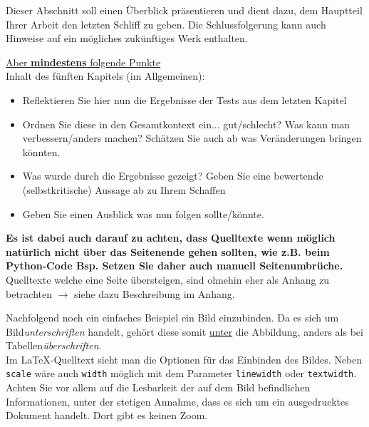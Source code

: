 Dieser Abschnitt soll einen Überblick präsentieren und dient dazu, dem Hauptteil Ihrer Arbeit den letzten Schliff zu geben. 
Die Schlussfolgerung kann auch Hinweise auf ein mögliches zukünftiges Werk enthalten.

\underline{Aber \textbf{mindestens} folgende Punkte}\\
Inhalt des fünften Kapitels (im Allgemeinen):
\begin{itemize}
    \item Reflektieren Sie hier nun die Ergebnisse der Tests aus dem letzten Kapitel
    \item Ordnen Sie diese in den Gesamtkontext ein... gut/schlecht? Was kann man verbessern/anders machen? Schätzen Sie auch ab was Veränderungen bringen könnten.
    \item Was wurde durch die Ergebnisse gezeigt? Geben Sie eine bewertende (selbstkritische) Aussage ab zu Ihrem Schaffen
    \item Geben Sie einen Ausblick was nun folgen sollte/könnte.
\end{itemize}






\textbf{Es ist dabei auch darauf zu achten, dass Quelltexte wenn möglich natürlich nicht über das Seitenende gehen sollten, wie z.B. beim Python-Code Bsp. Setzen Sie daher auch manuell
Seitenumbrüche.} Quelltexte welche eine Seite übersteigen, sind ohnehin eher als Anhang zu betrachten $\rightarrow$ siehe dazu Beschreibung im Anhang.





Nachfolgend noch ein einfaches Beispiel ein Bild einzubinden. Da es sich um Bild\textit{unterschriften} handelt, gehört diese somit \underline{unter} die Abbildung, anders als bei Tabellen\textit{überschriften}.\\
Im \LaTeX-Quelltext sieht man die Optionen für das Einbinden des Bildes. Neben \texttt{scale} wäre auch \texttt{width} möglich mit dem Parameter \texttt{linewidth} oder \texttt{textwidth}.\\
Achten Sie vor allem auf die Lesbarkeit der auf dem Bild befindlichen Informationen, unter der stetigen Annahme, dass es sich um ein ausgedrucktes Dokument handelt. Dort gibt es keinen Zoom.

